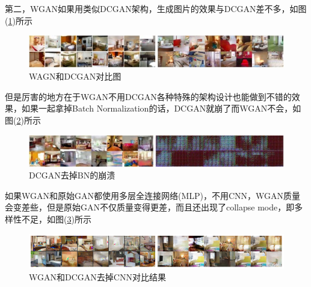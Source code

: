             第二，WGAN如果用类似DCGAN架构，生成图片的效果与DCGAN差不多，如图(\ref{fig:WAGN和DCGAN对比图})所示
                \begin{figure}[H]
                \centering
                \includegraphics[width=12cm]{images/WAGN_and_DCGAN.jpg}
                \caption{WAGN和DCGAN对比图}
                \label{fig:WAGN和DCGAN对比图}
                \end{figure}
            但是厉害的地方在于WGAN不用DCGAN各种特殊的架构设计也能做到不错的效果，如果一起拿掉Batch Normalization的话，DCGAN就崩了而WGAN不会，如图(\ref{fig:DCGAN去掉BN的崩溃})所示
                \begin{figure}[H]
                \centering
                \includegraphics[width=12cm]{images/DCGAN_remove_BN.jpg}
                \caption{DCGAN去掉BN的崩溃}
                \label{fig:DCGAN去掉BN的崩溃}
                \end{figure}
            如果WGAN和原始GAN都使用多层全连接网络(MLP)，不用CNN，WGAN质量会变差些，但是原始GAN不仅质量变得更差，而且还出现了collapse mode，即多样性不足，如图(\ref{fig:WGAN和DCGAN去掉CNN对比结果})所示
                \begin{figure}[H]
                \centering
                \includegraphics[width=12cm]{images/WGAN_and_DCGAN_remove_CNN.png}
                \caption{WGAN和DCGAN去掉CNN对比结果}
                \label{fig:WGAN和DCGAN去掉CNN对比结果}
                \end{figure}
